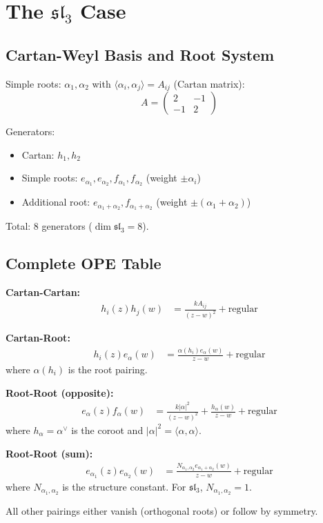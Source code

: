 \section{The $\mathfrak{sl}_3$ Case}

\subsection{Cartan-Weyl Basis and Root System}

\begin{definition}
Simple roots: $\alpha_1, \alpha_2$ with $\langle \alpha_i, \alpha_j \rangle = A_{ij}$ (Cartan matrix):
$$A = \begin{pmatrix} 2 & -1 \\ -1 & 2 \end{pmatrix}$$

Generators:
\begin{itemize}
\item Cartan: $h_1, h_2$
\item Simple roots: $e_{\alpha_1}, e_{\alpha_2}, f_{\alpha_1}, f_{\alpha_2}$ (weight $\pm \alpha_i$)
\item Additional root: $e_{\alpha_1+\alpha_2}, f_{\alpha_1+\alpha_2}$ (weight $\pm(\alpha_1+\alpha_2)$)
\end{itemize}
Total: $8$ generators ($\dim \mathfrak{sl}_3 = 8$).
\end{definition}

\subsection{Complete OPE Table}

\begin{theorem}
\label{thm:sl3-opes}
\textbf{Cartan-Cartan:}
\begin{align*}
h_i(z)h_j(w) &= \frac{k A_{ij}}{(z-w)^2} + \text{regular}
\end{align*}

\textbf{Cartan-Root:}
\begin{align*}
h_i(z)e_{\alpha}(w) &= \frac{\alpha(h_i) e_{\alpha}(w)}{z-w} + \text{regular}
\end{align*}
where $\alpha(h_i)$ is the root pairing.

\textbf{Root-Root (opposite):}
\begin{align*}
e_{\alpha}(z)f_{\alpha}(w) &= \frac{k |\alpha|^2}{(z-w)^2} + \frac{h_{\alpha}(w)}{z-w} + \text{regular}
\end{align*}
where $h_{\alpha} = \alpha^\vee$ is the coroot and $|\alpha|^2 = \langle \alpha, \alpha \rangle$.

\textbf{Root-Root (sum):}
\begin{align*}
e_{\alpha_1}(z)e_{\alpha_2}(w) &= \frac{N_{\alpha_1,\alpha_2} e_{\alpha_1+\alpha_2}(w)}{z-w} + \text{regular}
\end{align*}
where $N_{\alpha_1,\alpha_2}$ is the structure constant. For $\mathfrak{sl}_3$, $N_{\alpha_1,\alpha_2} = 1$.

All other pairings either vanish (orthogonal roots) or follow by symmetry.
\end{theorem}

